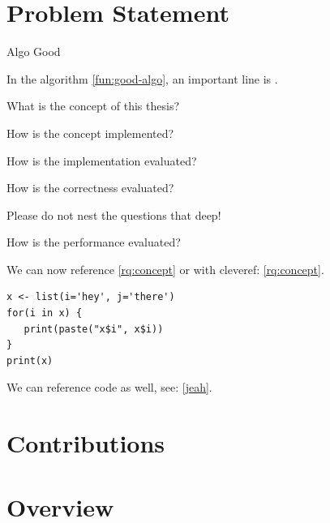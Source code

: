 \section{Problem Statement}

\begin{pseudo}[tbp]
	\caption{Algo Good}
	\label{fun:good-algo}
	\begin{algorithm}[H]
		\PreCode
		
		\StartCode
	\end{algorithm}
\end{pseudo}

In the  algorithm \cref{fun:good-algo}, an important line is .

\begin{rqs}
   \item \label{rq:concept} What is the concept of this thesis?
   \item \label{rq:implementation} How is the concept implemented?
   \item \label{rq:evaluation} How is the implementation evaluated?
   \begin{rqs}
      \item \label{rq:evaluation:correctness} How is the correctness evaluated? \begin{rqs}
         \item Please do not nest the questions that deep!
      \end{rqs}
      \item \label{rq:evaluation:performance} How is the performance evaluated?
   \end{rqs}
\end{rqs}

We can now reference \ref{rq:concept} or with cleveref: \cref{rq:concept}.


\begin{verbatim}
x <- list(i='hey', j='there')
for(i in x) {
   print(paste("x$i", x$i))
}
print(x)
\end{verbatim}

We can reference code as well, see: \cref{jeah}.

\section{Contributions}

\section{Overview}